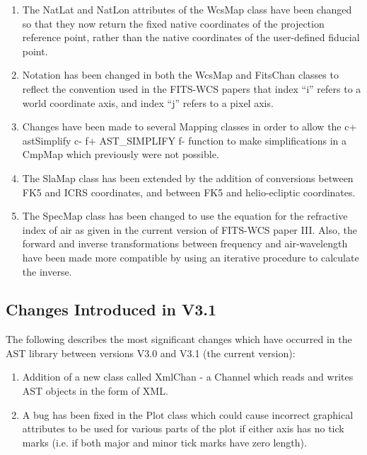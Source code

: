 \documentclass[twoside,11pt]{starlink}
\begin{document}
\begin{enumerate}
\item The NatLat and NatLon attributes of the WcsMap class have been
changed so that they now return the fixed native coordinates of the
projection reference point, rather than the native coordinates of the
user-defined fiducial point.

\item Notation has been changed in both the WcsMap and FitsChan classes to
reflect the convention used in the FITS-WCS papers that index ``i'' refers
to a world coordinate axis, and index ``j'' refers to a pixel axis.

\item Changes have been made to several Mapping classes in order to allow
the
c+
astSimplify
c-
f+
AST\_SIMPLIFY
f-
function to make simplifications in a CmpMap which previously were not
possible.

\item The SlaMap class has been extended by the addition of conversions
between FK5 and ICRS coordinates, and between FK5 and helio-ecliptic coordinates.

\item The SpecMap class has been changed to use the equation for the
refractive index of air as given in the current version of FITS-WCS paper
III. Also, the forward and inverse transformations between frequency and
air-wavelength have been made more compatible by using an iterative
procedure to calculate the inverse.

\end{enumerate}

\subsection{Changes Introduced in V3.1}

The following describes the most significant changes which have
occurred in the AST library between versions V3.0 and V3.1 (the
current version):

\begin{enumerate}
\item Addition of a new class called XmlChan - a Channel which
reads and writes AST objects in the form of XML.
\item A bug has been fixed in the Plot class which could cause incorrect
graphical attributes to be used for various parts of the plot if either
axis has no tick marks (i.e. if both major and minor tick marks have zero
length).
\end{enumerate}
\end{document}
